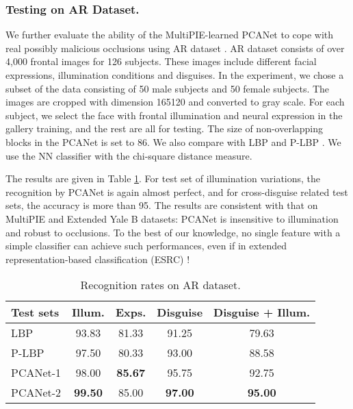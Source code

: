 \documentclass[10pt,journal,compsoc]{IEEEtran}
\begin{document}
\subsubsection{Testing on AR Dataset.}\label{sec: AR}
We further evaluate the ability of the MultiPIE-learned PCANet to cope with real possibly malicious occlusions using AR dataset \cite{Martinez1998}. AR dataset consists of over 4,000 frontal images for 126 subjects. These images include different facial expressions, illumination conditions and disguises. In the experiment, we chose a subset of the data consisting of 50 male subjects and 50 female subjects. The images are cropped with dimension 165120 and converted to gray scale. For each subject, we select the face with frontal illumination and neural expression in the gallery training, and the rest are all for testing. The size of non-overlapping blocks in the PCANet is set to 86. We also compare with LBP \cite{Ahonen2006} and P-LBP \cite{Tan2010}. We use the NN classifier with the chi-square distance measure.

The results are given in Table \ref{tab: AR_dataset}. For test set of illumination variations, the recognition by PCANet is again almost perfect, and for cross-disguise related test sets, the accuracy is more than 95. The results are consistent with that on MultiPIE and Extended Yale B datasets: PCANet is insensitive to illumination and robust to occlusions. To the best of our knowledge, no single feature with a simple classifier can achieve such performances, even if in extended representation-based classification (ESRC) \cite{Deng2012}! 

\begin{table}\centering
\caption{Recognition rates  on AR dataset.}
\begin{tabular}{l|c|c|c|c}
  \hline
Test sets & Illum. & Exps.  & Disguise  & Disguise + Illum.  \\ \hline \hline
  LBP \cite{Ahonen2006} & 93.83 & 81.33 & 91.25 & 79.63 \\
  P-LBP \cite{Tan2010}    & 97.50 & 80.33 & 93.00 & 88.58 \\ \hline
PCANet-1   & 98.00 & {\bf 85.67} & 95.75 & 92.75 \\
  PCANet-2   & {\bf 99.50} & 85.00 & {\bf 97.00} & {\bf 95.00}  \\
  \hline
\end{tabular}\label{tab: AR_dataset}
\end{table}
\end{document}
